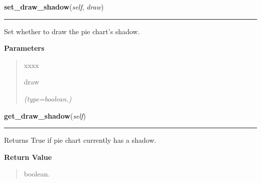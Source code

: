     \label{pygtk_chart:pie_chart:PieChart:set_draw_shadow}

    \vspace{0.5ex}

\hspace{.8\funcindent}\begin{boxedminipage}{\funcwidth}

    \raggedright \textbf{set\_draw\_shadow}(\textit{self}, \textit{draw})

    \vspace{-1.5ex}

    \rule{\textwidth}{0.5\fboxrule}
\setlength{\parskip}{2ex}
    Set whether to draw the pie chart's shadow.

\setlength{\parskip}{1ex}
      \textbf{Parameters}
      \vspace{-1ex}

      \begin{quote}
        \begin{Ventry}{xxxx}

          \item[draw]

            {\it (type=boolean.)}

        \end{Ventry}

      \end{quote}

    \end{boxedminipage}

    \label{pygtk_chart:pie_chart:PieChart:get_draw_shadow}

    \vspace{0.5ex}

\hspace{.8\funcindent}\begin{boxedminipage}{\funcwidth}

    \raggedright \textbf{get\_draw\_shadow}(\textit{self})

    \vspace{-1.5ex}

    \rule{\textwidth}{0.5\fboxrule}
\setlength{\parskip}{2ex}
    Returns True if pie chart currently has a shadow.

\setlength{\parskip}{1ex}
      \textbf{Return Value}
    \vspace{-1ex}

      \begin{quote}
      boolean.

      \end{quote}

    \end{boxedminipage}

